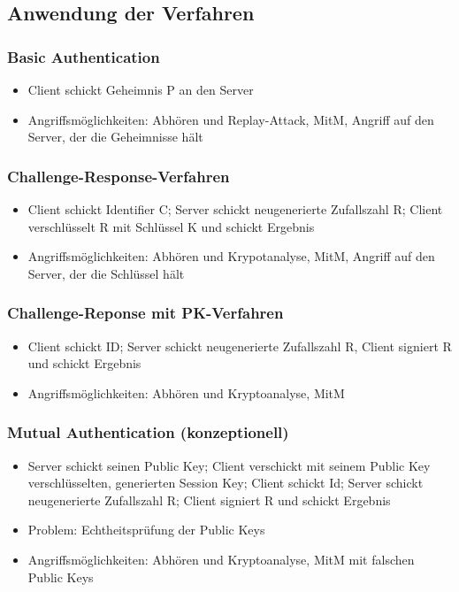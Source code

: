 \subsection{Anwendung der Verfahren}

\subsubsection{Basic Authentication}
\begin{itemize}
	\item Client schickt Geheimnis P an den Server
	\item Angriffsmöglichkeiten: Abhören und Replay-Attack, MitM, Angriff auf den Server, der die Geheimnisse hält
\end{itemize}

\subsubsection{Challenge-Response-Verfahren}
\begin{itemize}
	\item Client schickt Identifier C; Server schickt neugenerierte Zufallszahl R; Client verschlüsselt R mit Schlüssel K und schickt Ergebnis
	\item Angriffsmöglichkeiten: Abhören und Krypotanalyse, MitM, Angriff auf den Server, der die Schlüssel hält
\end{itemize}

\subsubsection{Challenge-Reponse mit PK-Verfahren}
\begin{itemize}
	\item Client schickt ID; Server schickt neugenerierte Zufallszahl R, Client signiert R und schickt Ergebnis
	\item Angriffsmöglichkeiten: Abhören und Kryptoanalyse, MitM
\end{itemize}

\subsubsection{Mutual Authentication (konzeptionell)}
\begin{itemize}
	\item Server schickt seinen Public Key; Client verschickt mit seinem Public Key verschlüsselten, generierten Session Key; Client schickt Id; Server schickt neugenerierte Zufallszahl R; Client signiert R und schickt Ergebnis
	\item Problem: Echtheitsprüfung der Public Keys
	\item Angriffsmöglichkeiten: Abhören und Kryptoanalyse, MitM mit falschen Public Keys
\end{itemize}

